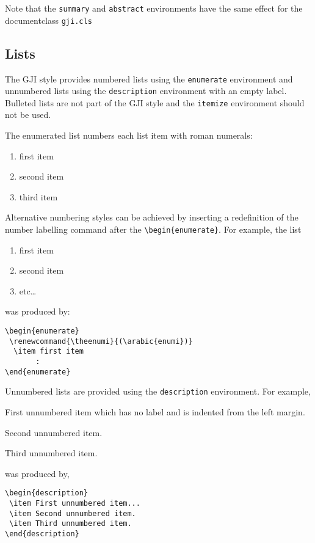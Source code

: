 Note that the \verb"summary" and \verb"abstract" environments have the same
effect for the documentclass \verb"gji.cls"

\subsection{Lists}

The GJI style provides numbered lists using the \verb"enumerate" environment and
unnumbered lists using the \verb"description" environment with an empty label.
Bulleted lists are not part of the GJI style and the \verb"itemize" environment
should not be used.

The enumerated list numbers each list item with roman numerals:
\begin{enumerate}
  \item first item
  \item second item
  \item third item
\end{enumerate}
Alternative numbering styles can be achieved by inserting a redefinition of the
number labelling command after the \verb"\begin{enumerate}". For example, the
list
\begin{enumerate}
\renewcommand{\theenumi}{(\arabic{enumi})}
  \item first item
  \item second item
  \item etc\ldots
\end{enumerate}
was produced by:
\begin{verbatim}
\begin{enumerate}
 \renewcommand{\theenumi}{(\arabic{enumi})}
  \item first item
       :
\end{enumerate}
\end{verbatim}
Unnumbered lists are provided using the \verb"description" environment. For
example,
\begin{description}
  \item First unnumbered item which has no label and is indented from the left
        margin.
  \item Second unnumbered item.
  \item Third unnumbered item.
\end{description}
was produced by,
\begin{verbatim}
\begin{description}
 \item First unnumbered item...
 \item Second unnumbered item.
 \item Third unnumbered item.
\end{description}
\end{verbatim}

